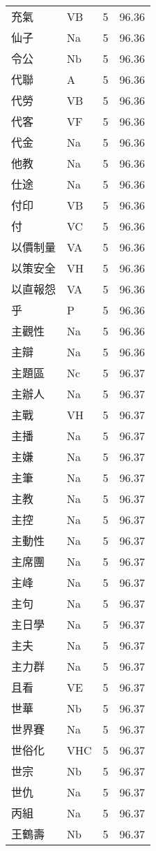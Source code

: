 \documentclass[twocolumn]{book}
\begin{document}
\begin{supertabular}{llrr}
充氣 & VB & 5 &  96.36\\
仙子 & Na & 5 &  96.36\\
令公 & Nb & 5 &  96.36\\
代聯 & A & 5 &  96.36\\
代勞 & VB & 5 &  96.36\\
代客 & VF & 5 &  96.36\\
代金 & Na & 5 &  96.36\\
他教 & Na & 5 &  96.36\\
仕途 & Na & 5 &  96.36\\
付印 & VB & 5 &  96.36\\
付 & VC & 5 &  96.36\\
以價制量 & VA & 5 &  96.36\\
以策安全 & VH & 5 &  96.36\\
以直報怨 & VA & 5 &  96.36\\
乎 & P & 5 &  96.36\\
主觀性 & Na & 5 &  96.36\\
主辯 & Na & 5 &  96.36\\
主題區 & Nc & 5 &  96.37\\
主辦人 & Na & 5 &  96.37\\
主戰 & VH & 5 &  96.37\\
主播 & Na & 5 &  96.37\\
主嫌 & Na & 5 &  96.37\\
主筆 & Na & 5 &  96.37\\
主教 & Na & 5 &  96.37\\
主控 & Na & 5 &  96.37\\
主動性 & Na & 5 &  96.37\\
主席團 & Na & 5 &  96.37\\
主峰 & Na & 5 &  96.37\\
主句 & Na & 5 &  96.37\\
主日學 & Na & 5 &  96.37\\
主夫 & Na & 5 &  96.37\\
主力群 & Na & 5 &  96.37\\
且看 & VE & 5 &  96.37\\
世華 & Nb & 5 &  96.37\\
世界賽 & Na & 5 &  96.37\\
世俗化 & VHC & 5 &  96.37\\
世宗 & Nb & 5 &  96.37\\
世仇 & Na & 5 &  96.37\\
丙組 & Na & 5 &  96.37\\
王鶴壽 & Nb & 5 &  96.37\\

\end{supertabular}
\end{document}
